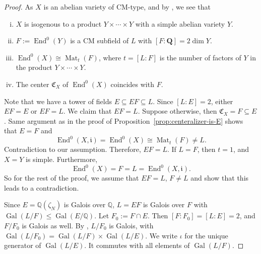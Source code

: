 \documentclass{amsart}[11pt]
\theoremstyle{definition}
\numberwithin{equation}{section}
\theoremstyle{notitle}
\begin{document}
\begin{proof}
As $X$ is an abelian variety of CM-type, and by
\cite[Section II.5]{Shimura_CM}, we see that

\begin{enumerate}[(i)]
\item $X$ is isogenous to a product $Y\times \cdots \times Y$
  with a simple abelian variety $Y$. 
\item $F:=\operatorname{End}^0(Y)$ is a CM subfield of $L$ with $[F:{\mathbf{Q}}]=2\dim Y$.
\item $\operatorname{End}^0(X)\cong \operatorname{Mat}_t(F)$, where $t=[L:F]$ is the number of
  factors of $Y$ in the product $Y\times \cdots \times Y$. 
\item The center ${\mathfrak{C}}_X$ of $\operatorname{End}^0(X)$ coincides with $F$. 
\end{enumerate}

Note that we have a tower of fields $E\subseteq EF\subseteq L$. Since
$[L:E]=2$, either $EF=E$ or $EF=L$. We claim that $EF=L$. Suppose
otherwise, then ${\mathfrak{C}}_X=F\subseteq E$. Same argument as in the proof of
Proposition~\ref{prop:centeralizer-is-E} shows that $E=F$ and
    \[\operatorname{End}^0(X,{\mathfrak{i}})=\operatorname{End}^0(X)\cong \operatorname{Mat}_t(F)\neq L. \]
    Contradiction to our assumption. Therefore, $EF=L$. If $L=F$, then
    $t=1$, and $X=Y$ is simple. Furthermore,
    \[ \operatorname{End}^0(X)=F=L=\operatorname{End}^0(X,{\mathfrak{i}}).\] So for the rest of the proof, we
    assume that $EF=L$, $F\neq L$ and show that this leads to a
    contradiction.

    Since $E={\mathbb{Q}}(\zeta_N)$ is Galois over ${\mathbb{Q}}$, $L=EF$ is Galois over
    $F$ with $\operatorname{Gal}(L/F)\leq \operatorname{Gal}(E/{\mathbb{Q}})$. Let $F_0:=F\cap E$. Then
    $[F:F_0]= [L:E]=2$, and $F/F_0$ is Galois as well.  By \cite[
    Theorem VI.1.14]{MR1878556} , $L/F_0$ is Galois, with
    $\operatorname{Gal}(L/F_0)= \operatorname{Gal}(L/F)\times \operatorname{Gal}(L/E)$. We write $\iota$ for the
    unique generator of $\operatorname{Gal}(L/E)$. It commutes with all elements of
    $\operatorname{Gal}(L/F)$.


\end{proof}
\end{document}
